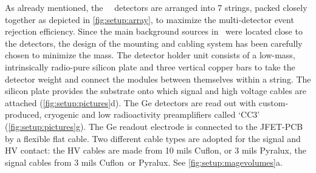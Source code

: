 As already mentioned, the \gerda\ \phasetwo\ detectors are arranged into 7 strings, packed
closely together as depicted in \cref{fig:setup:array}, to maximize the multi-detector
event rejection efficiency. Since the main background sources in \phaseone\ were located
close to the detectors, the design of the mounting and cabling system has been carefully
chosen to minimize the mass. The detector holder unit consists of a low-mass,
intrinsically radio-pure silicon plate and three vertical copper bars to take the detector
weight and connect the modules between themselves within a string. The silicon plate
provides the substrate onto which signal and high voltage cables are attached
(\cref{fig:setup:pictures}d). The Ge detectors are read out with custom-produced,
cryogenic and low radioactivity preamplifiers called `CC3'~\cite{Riboldi2015}
(\cref{fig:setup:pictures}g). The Ge readout electrode is connected to the JFET-PCB by a
flexible flat cable. Two different cable types are adopted for the signal and HV contact:
the HV cables are made from 10 mils Cuflon\reg, or 3 mils Pyralux\reg, the signal cables
from 3 mils Cuflon\reg\ or Pyralux\reg. See \cref{fig:setup:magevolumes}a.

